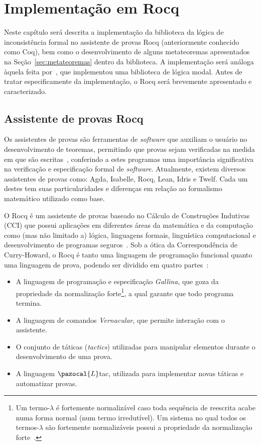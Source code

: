 \chapter{Implementação em Rocq}\label{cap:implementacao}

Neste capítulo será descrita a implementação da biblioteca da lógica de inconsistência formal \lfium{} no assistente de provas Rocq (anteriormente conhecido como Coq), bem como o desenvolvimento de alguns metateoremas apresentados na Seção~\ref{sec:metateoremas} dentro da biblioteca. A implementação será análoga àquela feita por~, que implementou uma biblioteca de lógica modal. Antes de tratar especificamente da implementação, o Rocq será brevemente apresentado e caracterizado.

\section{Assistente de provas Rocq}\label{sec:rocq}
    Os assistentes de provas são ferramentas de \textit{software} que auxiliam o usuário no desenvolvimento de teoremas, permitindo que provas sejam verificadas na medida em que são escritas~\cite{geuvers2009proof}, conferindo a estes programas uma importância significativa na verificação e especificação formal de \textit{software}. Atualmente, existem diversos assistentes de provas como: Agda, Isabelle, Rocq, Lean, Idris e Twelf. Cada um destes tem suas particularidades e diferenças em relação ao formalismo matemático utilizado como base.

    O Rocq é um assistente de provas baseado no Cálculo de Construções Indutivas (CCI) que possui aplicações em diferentes áreas da matemática e da computação como (mas não limitado a) lógica, linguagens formais, linguística computacional e desenvolvimento de programas seguros~\cite{coqart}. Sob a ótica da Correspondência de Curry{-}Howard, o Rocq é tanto uma linguagem de programação funcional quanto uma linguagem de prova, podendo ser dividido em quatro partes~\cite{silva2019certificaccao}:
    
    \begin{itemize}
        \item A linguagem de programação e especificação \textit{Gallina}, que goza da propriedade da normalização forte\footnote{Um termo-$\lambda$ é fortemente normalizável caso toda sequência de reescrita acabe numa forma normal (num termo irredutível). Um sistema no qual todos os termos-$\lambda$ são fortemente normalizáveis possui a propriedade da normalização forte~\cite{nipkow2006rewriting}.}, a qual garante que todo programa termina.
        \item A linguagem de comandos \textit{Vernacular}, que permite interação com o assistente.
        \item O conjunto de táticas (\textit{tactics}) utilizadas para manipular elementos durante o desenvolvimento de uma prova.
        \item A linguagem $\pazocal{L}$tac, utilizada para implementar novas táticas e automatizar provas.
    \end{itemize}

